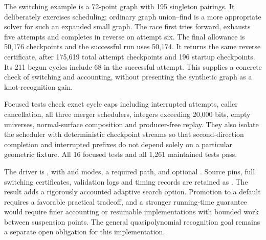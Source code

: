 The switching example is a 72-point graph with 195 singleton pairings.
It deliberately exercises scheduling; ordinary graph union--find is a
more appropriate solver for such an expanded small graph. The race first
tries forward, exhausts five attempts and completes in reverse on attempt
six. The final allowance is 50,176 checkpoints and the successful run uses
50,174. It returns the same reverse certificate, after 175,619 total
attempt checkpoints and 196 startup checkpoints. Its 211 begun cycles
include 68 in the successful attempt. This supplies a concrete check of
switching and accounting, without presenting the synthetic graph as a
knot-recognition gain.

Focused tests check exact cycle caps including interrupted attempts,
caller cancellation, all three merger schedulers, integers exceeding
20,000 bits, empty universes, normal-surface composition and producer-free
replay. They also isolate the scheduler with deterministic checkpoint
streams so that second-direction completion and interrupted prefixes do
not depend solely on a particular geometric fixture.
All 16 focused tests and all 1,261 maintained tests pass.


The driver is , with
 and  modes, a required  path,
and optional . Source pins, full switching certificates,
validation logs and timing records are retained as .
The result adds a rigorously accounted adaptive search option. Promotion
to a default requires a favorable practical tradeoff, and a stronger
running-time guarantee would require finer accounting or resumable
implementations with bounded work between suspension points. The general
quasipolynomial recognition goal remains a separate open obligation for
this implementation.
